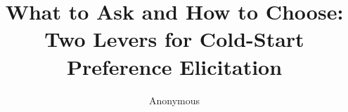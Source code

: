 \documentclass[runningheads]{llncs}
\begin{document}
\title{What to Ask and How to Choose: Two Levers for Cold-Start Preference Elicitation}

\author{Anonymous}

\maketitle

\end{document}
